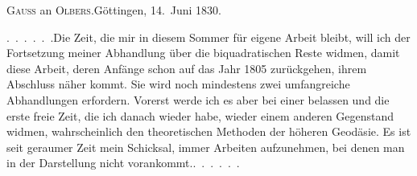 \begin{center}
\textsc{Gauss} an \textsc{Olbers}.\quad Göttingen, 14.~Juni 1830.
\end{center}

\par\noindent\hspace*{\parindent}\mbox{.\ .\ .\ .\ .\ .}\quad Die Zeit, die mir in diesem Sommer für eigene Arbeit bleibt, will ich der Fortsetzung meiner Abhandlung über die biquadratischen Reste widmen, damit diese Arbeit, deren Anfänge schon auf das Jahr 1805 zurückgehen, ihrem Abschluss näher kommt.
Sie wird noch mindestens zwei umfangreiche Abhandlungen erfordern. Vorerst werde ich es aber bei einer belassen und die erste freie Zeit, die ich danach wieder habe, wieder einem anderen Gegenstand widmen, wahrscheinlich den theoretischen Methoden der höheren Geodäsie.
Es ist seit geraumer Zeit mein Schicksal, immer Arbeiten aufzunehmen, bei denen man in der Darstellung nicht  vorankommt.\quad\mbox{.\ .\ .\ .\ .\ .}

